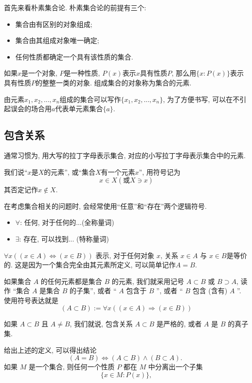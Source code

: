 \documentclass{ctexart}
\begin{document}
首先来看朴素集合论. 朴素集合论的前提有三个: 

\begin{itemize}
    \item 集合由有区别的对象组成;
    \item 集合由其组成对象唯一确定; 
    \item 任何性质都确定一个具有该性质的集合.
\end{itemize}

如果$x$是一个对象, $P$是一种性质, $P(x)$表示$x$具有性质$P$, 那么用$\{ x:P(x) \}$表示具有性质$P$的整整一类的对象. 
组成集合的对象称为集合的元素. 

由元素$x_1, x_2, ..., x_n$组成的集合可以写作$\{ x_1, x_2, ..., x_n \}$, 为了方便书写, 可以在不引起误会的场合用$a$代表单元素集合$\{ a \}$. 

\subsection{包含关系} 通常习惯为, 用大写的拉丁字母表示集合, 对应的小写拉丁字母表示集合中的元素. 

我们说``$x$是$X$的元素'', 或``集合$X$有一个元素$x$'', 用符号记为
\[
x \in X ( \text{或} X \ni x)
\]
其否定记作$x \notin X$.

在考虑集合相关的问题时, 会经常使用``任意''和``存在''两个逻辑符号. 
\begin{itemize}
    \item $\forall$: 任何, 对于任何的...(全称量词)
    \item $\exists$: 存在, 可以找到... (特称量词)
\end{itemize}

$\forall x((x \in A) \Leftrightarrow(x \in B))$ 表示, 对于任何对象 $x$, 关系 $x \in A$ 与 $x \in B$是等价的. 这是因为一个集合完全由其元素所定义, 可以简单记作$A=B$. 

如果集合 $A$ 的任何元素都是集合 $B$ 的元素, 我们就采用记号 $A \subset B$ 或 $B \supset A$, 读作 “集合 $A$ 是集合 $B$ 的子集”, 或者 “ $A$ 包含于 $B$ ”, 或者 “ $B$ 包含 (含有) $A$ ”. 使用符号表达就是
$$
(A \subset B):=\forall x((x \in A) \Rightarrow(x \in B))
$$

如果 $A \subset B$ 且 $A \neq B$, 我们就说, 包含关系 $A \subset B$ 是严格的, 或者 $A$ 是 $B$ 的真子集.

给出上述的定义, 可以得出结论
$$
(A=B) \Leftrightarrow(A \subset B) \wedge(B \subset A) \text {. }
$$
如果 $M$ 是一个集合, 则任何一个性质 $P$ 都在 $M$ 中分离出一个子集
$$
\{x \in M : P(x)\},
$$
\end{document}
